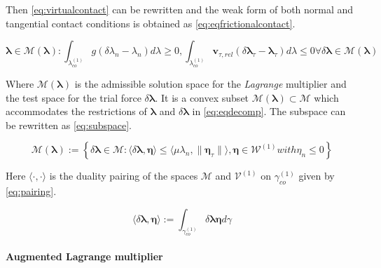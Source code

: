 \documentclass[a4paper,10pt]{article} %
\begin{document}
Then  \eqref{eq:virtualcontact} can be rewritten and the weak form of both normal and tangential contact conditions is obtained as \eqref{eq:eqfrictionalcontact}.

\begin{subequations}\label{eq:eqfrictionalcontact}
\begin{equation}
\boldsymbol{\lambda} \in \mathcal{M}(\boldsymbol{\lambda}) : \int_{\lambda_{co}^{(1)}} g (\delta \lambda_n - \lambda_n) d \lambda \geq 0,
\end{equation}
\begin{equation}
\int_{\lambda_{co}^{(1)}} \mathbf{v}_{\tau,rel} (\delta \boldsymbol{\lambda}_\tau - \boldsymbol{\lambda}_\tau) d \lambda \leq 0 \forall \delta \boldsymbol{\lambda} \in \mathcal{M}(\boldsymbol{\lambda})
\end{equation}
\end{subequations}

Where $ \mathcal{M}(\boldsymbol{\lambda})$ is the admissible solution space for the \textit{Lagrange} multiplier and the test space for the trial force $\delta \boldsymbol{\lambda}$. It is a convex subset $ \mathcal{M}(\boldsymbol{\lambda}) \subset \mathcal{M}$ which accommodates the restrictions of $\boldsymbol{\lambda}$ and $\delta \boldsymbol{\lambda}$ in \eqref{eq:eqdecomp}. The subspace can be rewritten as \eqref{eq:subspace}.

\begin{equation}\label{eq:subspace}
    \mathcal{M}(\boldsymbol{\lambda}) := \left\{ \delta \boldsymbol{\lambda} \in  \mathcal{M} : \langle \delta \boldsymbol{\lambda}, \boldsymbol{\eta} \rangle \leq \langle \mu \lambda_n, \| \boldsymbol{\eta}_\tau \| \rangle, \boldsymbol{\eta} \in \mathcal{W}^{(1)} with \eta_n \leq 0 \right\}
\end{equation}

Here $\langle \cdot, \cdot \rangle$ is the duality pairing of the spaces $\mathcal{M}$ and $\mathcal{V}^{(1)}$ on $\gamma_{co}^{(1)}$ given by \eqref{eq:pairing}.

\begin{equation}\label{eq:pairing}
\langle \delta \boldsymbol{\lambda}, \boldsymbol{\eta} \rangle := \int_{\gamma_{co}^{(1)}} \delta \boldsymbol{\lambda} \boldsymbol{\eta} d \gamma
\end{equation}

\paragraph{Augmented Lagrange multiplier}
\end{document}
